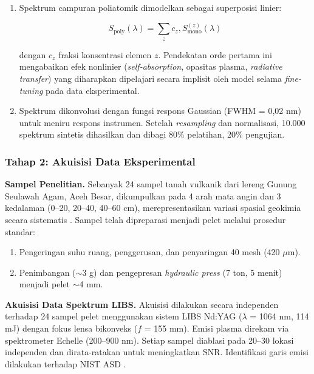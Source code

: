 \documentclass[12pt, a4paper]{article}
\begin{document}
\begin{enumerate}[label=\arabic*., leftmargin=2cm]
\begin{equation}
S_{\mathrm{mono}}^{(z)}(\lambda)
=
\sum_{k \rightarrow i}
I_{ki}^{(z)}
, V(\lambda-\lambda_{ki})
\end{equation}

\item Spektrum campuran poliatomik dimodelkan sebagai superposisi linier:

\begin{equation}
S_{\mathrm{poly}}(\lambda)
=
\sum_{z}
c_z
, S_{\mathrm{mono}}^{(z)}(\lambda)
\end{equation}

dengan $c_z$ fraksi konsentrasi elemen $z$. Pendekatan orde pertama ini mengabaikan efek nonlinier (\textit{self-absorption}, opasitas plasma, \textit{radiative transfer}) yang diharapkan dipelajari secara implisit oleh model selama \textit{fine-tuning} pada data eksperimental.

\item Spektrum dikonvolusi dengan fungsi respons Gaussian (FWHM = 0,02 nm) untuk meniru respons instrumen. Setelah \textit{resampling} dan normalisasi, 10.000 spektrum sintetis dihasilkan dan dibagi 80\% pelatihan, 20\% pengujian.

\end{enumerate}



\subsubsection{Tahap 2: Akuisisi Data Eksperimental}

\noindent\textbf{Sampel Penelitian.}
Sebanyak 24 sampel tanah vulkanik dari lereng Gunung Seulawah Agam, Aceh Besar, dikumpulkan pada 4 arah mata angin dan 3 kedalaman (0--20, 20--40, 40--60 cm), merepresentasikan variasi spasial geokimia secara sistematis \citep{khumaeni_analysis_2025}. Sampel telah dipreparasi menjadi pelet melalui prosedur standar:
\begin{enumerate}[leftmargin=2cm]
    \item Pengeringan suhu ruang, penggerusan, dan penyaringan 40 mesh (420 $\mu$m).
    \item Penimbangan ($\sim$3 g) dan pengepresan \textit{hydraulic press} (7 ton, 5 menit) menjadi pelet $\sim$4 mm.
\end{enumerate}


\noindent\textbf{Akuisisi Data Spektrum LIBS.}
Akuisisi dilakukan secara independen terhadap 24 sampel pelet menggunakan sistem LIBS Nd:YAG ($\lambda$ = 1064 nm, 114 mJ) dengan fokus lensa bikonveks ($f$ = 155 mm). Emisi plasma direkam via spektrometer Echelle (200--900 nm). Setiap sampel diablasi pada 20--30 lokasi independen dan dirata-ratakan untuk meningkatkan SNR. Identifikasi garis emisi dilakukan terhadap NIST ASD \citep{kramida2024}.
\end{document}
